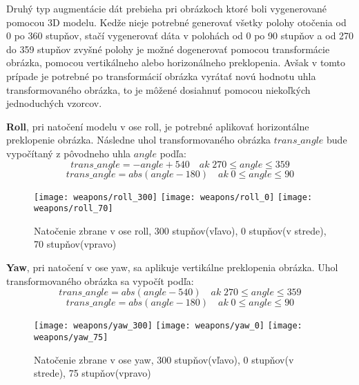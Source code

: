 Druhý typ augmentácie dát prebieha pri obrázkoch ktoré boli vygenerované pomocou 3D modelu.
Kedže nieje potrebné generovať všetky polohy otočenia od 0 po 360 stupňov, stačí vygenerovať dáta v polohách od 0 po 90 stupňov a od 270 do 359 stupňov
    zvyšné polohy je možné dogenerovať pomocou transformácie obrázka, pomocou vertikálneho alebo horizonálneho preklopenia.
Avšak v tomto prípade je potrebné po transformácií obrázka vyrátať novú hodnotu uhla transformovaného obrázka, to je môžené dosiahnuť pomocou niekoľkých
    jednoduchých vzorcov.

\textbf{Roll}, pri natočení modelu v ose roll, je potrebné aplikovať horizontálne preklopenie obrázka.
Následne uhol transformovaného obrázka $trans\_angle$ bude vypočítaný z pôvodneho uhla $angle$ podľa:
\begin{equation}
    trans\_angle = -angle + 540 \quad ak \; 270 \leq angle \leq 359
\end{equation}
\begin{equation}
    trans\_angle = abs(angle - 180) \quad ak \; 0 \leq angle \leq 90
\end{equation}

\begin{figure}[H]
    \centering
    \texttt{[image: weapons/roll\_300]}
    \quad
    \texttt{[image: weapons/roll\_0]}
    \quad
    \texttt{[image: weapons/roll\_70]}
    \caption{Natočenie zbrane v ose roll, 300 stupňov(vľavo), 0 stupňov(v strede), 70 stupňov(vpravo)}
    \label{pic:rollrotation}
\end{figure}

\textbf{Yaw}, pri natočení v ose yaw, sa aplikuje vertikálne preklopenia obrázka.
Uhol transformovaného obrázka sa vypočít podľa:
\begin{equation}
    trans\_angle = abs(angle - 540) \quad ak \; 270 \leq angle \leq 359
\end{equation}
\begin{equation}
    trans\_angle = abs(angle - 180) \quad ak \; 0 \leq angle \leq 90
\end{equation}

\begin{figure}[H]
    \centering
    \texttt{[image: weapons/yaw\_300]}
    \quad
    \texttt{[image: weapons/yaw\_0]}
    \quad
    \texttt{[image: weapons/yaw\_75]}
    \caption{Natočenie zbrane v ose yaw, 300 stupňov(vľavo), 0 stupňov(v strede), 75 stupňov(vpravo)}
    \label{pic:yawrotation}
\end{figure}

